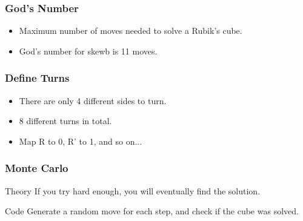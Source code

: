 \documentclass[aspectratio=169]{beamer}
\begin{document}
%
%
%





\begin{frame}
\frametitle{God's Number}
\begin{itemize}
    \item<1-> Maximum number of moves needed to solve a Rubik's cube.
    \item<2-> God's number for skewb is 11 moves.
\end{itemize}
\end{frame}





\begin{frame}
\frametitle{Define Turns}
\begin{itemize}
    \item There are only 4 different sides to turn.
    \item 8 different turns in total.
    \item Map R to 0, R' to 1, and so on...
\end{itemize}
\end{frame}





\begin{frame}
\frametitle{Monte Carlo}

\begin{block}{Theory}
    If you try hard enough, you will eventually find the solution.
\end{block}

\begin{block}{Code}
    Generate a random move for each step, and check if the cube was solved.
\end{block}

\end{frame}
\end{document}
